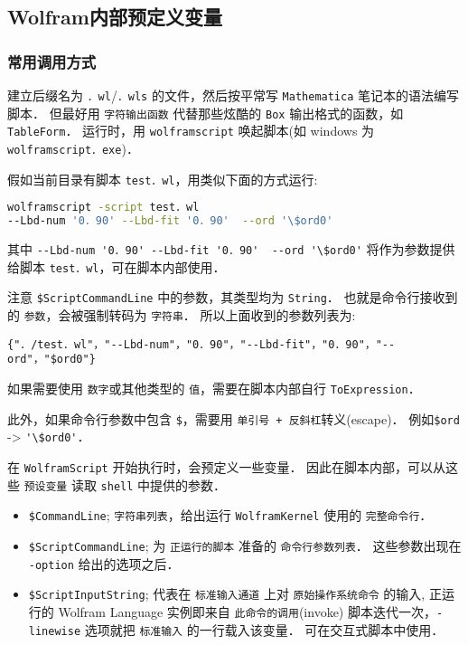 \subsection{Wolfram内部预定义变量}

\subsubsection{常用调用方式}

建立后缀名为 \verb`．wl`/\verb`．wls` 的文件，然后按平常写 \verb`Mathematica` 笔记本的语法编写脚本．
但最好用 \verb`字符输出函数` 代替那些炫酷的 \verb`Box` 输出格式的函数，如 \verb`TableForm`．
运行时，用 \verb`wolframscript` 唤起脚本(如 windows 为 \verb`wolframscript．exe`)．

假如当前目录有脚本 \verb`test．wl`，用类似下面的方式运行:
\begin{lstlisting}[language=bash]
wolframscript -script test．wl  
--Lbd-num '0．90' --Lbd-fit '0．90'  --ord '\$ord0'
\end{lstlisting}

其中 \verb`--Lbd-num '0．90' --Lbd-fit '0．90'  --ord '\$ord0'` 将作为参数提供给脚本 \verb`test．wl`，可在脚本内部使用．

注意 \verb`$ScriptCommandLine` 中的参数，其类型均为 \verb`String`．
也就是命令行接收到的 \verb`参数`，会被强制转码为 \verb`字符串`．
所以上面收到的参数列表为:
\begin{lstlisting}[language=wolfram]
{"．/test．wl"，"--Lbd-num"，"0．90"，"--Lbd-fit"，"0．90"，"--ord"，"$ord0"}
\end{lstlisting}

如果需要使用 \verb`数字`或其他类型的 \verb`值`，需要在脚本内部自行 \verb`ToExpression`．

此外，如果命令行参数中包含 \verb`$`，需要用 \verb`单引号 + 反斜杠`转义(escape)．
例如\verb`$ord` -> \verb`'\$ord0'`．

在 \verb`WolframScript` 开始执行时，会预定义一些变量．
因此在脚本内部，可以从这些 \verb`预设变量` 读取 \verb`shell` 中提供的参数．

\begin{itemize}
\item \verb`$CommandLine`; \verb`字符串列表`，给出运行 \verb`WolframKernel` 使用的 \verb`完整命令行`．
\item \verb`$ScriptCommandLine`; 为 \verb`正运行的脚本` 准备的 \verb`命令行参数列表`．
这些参数出现在 \verb`-option` 给出的选项之后．
\item \verb`$ScriptInputString`; 代表在 \verb`标准输入通道` 上对 \verb`原始操作系统命令` 的输入,
正运行的 Wolfram Language 实例即来自 \verb`此命令的调用`(invoke)
脚本迭代一次，\verb`-linewise` 选项就把 \verb`标准输入` 的一行载入该变量．
可在交互式脚本中使用．
\end{itemize}


